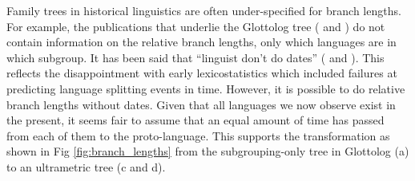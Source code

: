 \documentclass[a4paper,10pt]{article} %
\begin{document}
%
%
%    
Family trees in historical linguistics are often under-specified for branch lengths. For example, the publications that underlie the Glottolog tree (\citet{blust_2009, blust_2014} and \citet{blust_chen_2017}) do not contain information on the relative branch lengths, only which languages are in which subgroup. It has been said that ``linguist don't do dates'' (\citet{mcmahon2006linguists} and \citet{gray2011language}). This reflects the disappointment with early lexicostatistics which included failures at predicting language splitting events in time. However, it is possible to do relative branch lengths without dates. Given that all languages we now observe exist in the present, it seems fair to assume that an equal amount of time has passed from each of them to the proto-language. This supports the transformation as shown in Fig \ref{fig:branch_lengths} from the subgrouping-only tree in Glottolog (a) to an ultrametric tree (c and d).
\end{document}
